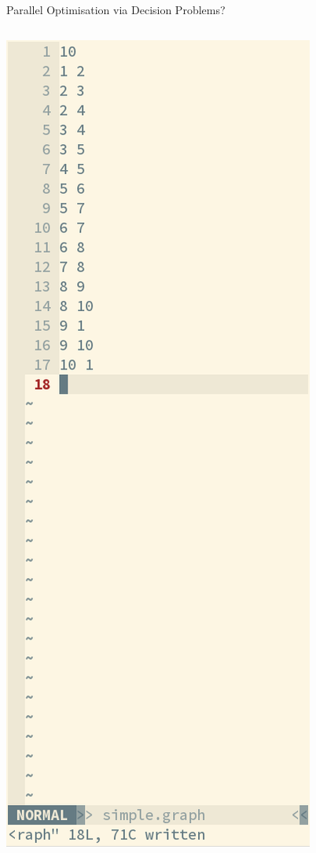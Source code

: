 \documentclass{beamer}
\begin{document}
\begin{frame}{Parallel Optimisation via Decision Problems?}
{\begin{columns}[T]
            \centering\includegraphics*[keepaspectratio=true,scale=0.18]{images/colouring-graph.png}
        \end{columns}
    }


\end{frame}
\end{document}
